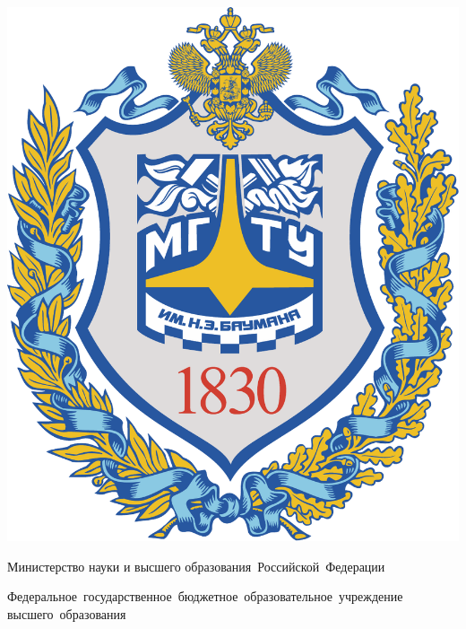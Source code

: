 \def\myname{К. А. Рунов}
\def\notmyname{Ю. В. Строганов}
\def\mygroup{ИУ7-64Б}
\def\mytheme{Разработка базы данных для АРМ разметчика параллельного корпуса технических текстов.}

\begin{titlepage}
    \fontsize{12pt}{12pt}\selectfont

    \noindent
    \begin{center}
        \begin{minipage}{0.14\textwidth}
            \includegraphics[width=\linewidth]{img/bmstu.pdf}
        \end{minipage}
        \hfill
        \begin{minipage}{0.85\textwidth}\centering\bfseries
            {
                \linespread{1}\selectfont
                \vspace{0.1cm}
                {Министерство науки и высшего образования~Российской~Федерации}

                {Федеральное~государственное~бюджетное~образовательное~учреждение высшего~образования}

}
\end{minipage}
\end{center}
\end{titlepage}
